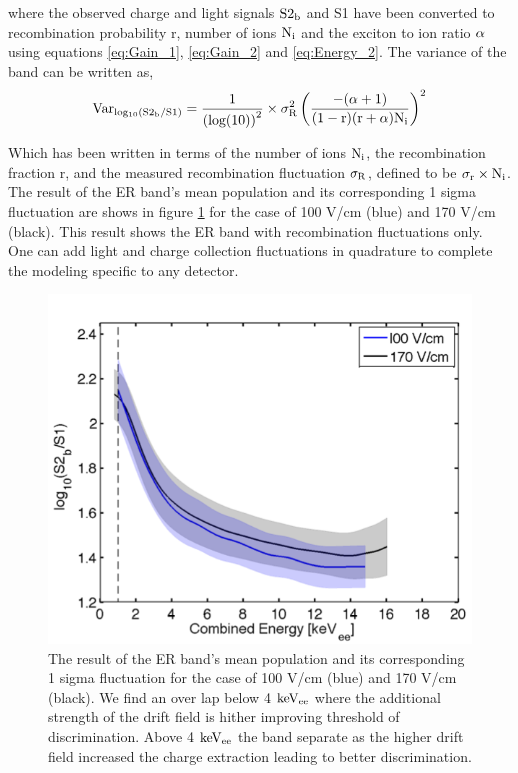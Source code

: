 \noindent where the observed charge and light signals $\rm S2_b$ and S1 have been converted to recombination probability r,  number of ions $\rm N_i$ and the exciton to ion ratio $\rm \alpha$ using equations \ref{eq:Gain_1}, \ref{eq:Gain_2} and \ref{eq:Energy_2}. The variance of the band can be written as,
\begin{equation}
\rm Var_{log_{10}(S2_b/S1)} = \frac{1}{\left(log(10)\right)^2} \times \sigma_R^2 \left( \frac{ - (\alpha+1) }{(1-r)(r+\alpha)N_i} \right)^2
\label{eq:Band_Var}
\end{equation}

\noindent Which has been written in terms of the number of ions $\rm N_i$, the recombination fraction r, and the measured recombination fluctuation $\rm \sigma_R$, defined to be $\rm \sigma_r\times N_i$. The result of the ER band's mean population and its corresponding 1 sigma fluctuation are shows in figure \ref{fig:ER_Band_Calc} for the case of 100 V/cm (blue) and 170 V/cm (black). This result shows the ER band with recombination fluctuations only. One can add light and charge collection fluctuations in quadrature to complete the modeling specific to any detector. 

\begin{figure}[h!]\centering
\includegraphics[width=130mm]{Chapter_Flucs/Figures/Iter1_100/Band_comp.png}
\caption{The result of the ER band's mean population and its corresponding 1 sigma fluctuation for the case of 100 V/cm (blue) and 170 V/cm (black). We find an over lap below 4 $\rm keV_{ee}$ where the additional strength of the drift field is hither improving threshold of discrimination. Above 4 $\rm keV_{ee}$ the band separate as the higher drift field increased the charge extraction leading to better discrimination.}
\label{fig:ER_Band_Calc}
\end{figure}

